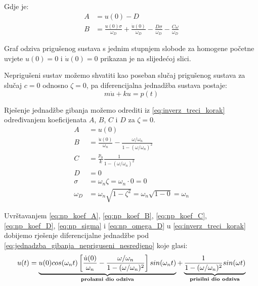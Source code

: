 Gdje je:
\begin{align}
    A &= u(0)-D\label{eq:koef_A}\\
    B &= \frac{u(0)\sigma}{\omega_D}+
         \frac{\dot{u}(0)}{\omega_D}-
         \frac{D\sigma}{\omega_D}-
         \frac{C\omega}{\omega_D}\label{eq:koef_B}
\end{align}

Graf odziva prigušenog sustava s jednim stupnjem slobode za homogene početne
uvjete $u(0)=0$ i $\dot{u}(0)=0$ prikazan je na slijedećoj slici.

Neprigušeni sustav možemo shvatiti kao poseban slučaj prigušenog sustava za slučaj
$c=0$ odnosno $\zeta=0$, pa diferencijalna jednadžba sustava postaje:
\begin{equation}\label{eq:jednadzba_gibanja_nepriguseni_nesredjeno}
	m\ddot{u}+ku=p(t)
\end{equation}

Rješenje jednadžbe gibanja možemo odrediti iz \eqref{eq:inverz_treci_korak}
određivanjem koeficijenata $A$, $B$, $C$ i $D$ za $\zeta = 0$.
\begin{align}
    A &= u(0) \label{eq:np_koef_A}\\
    B &= \frac{\dot{u}(0)}{\omega_n}-\frac{\omega/\omega_n}{1-(\omega/\omega_n)^2}\label{eq:np_koef_B}\\
    C &= \frac{p_0}{k}\frac{1}{1-(\omega/\omega_n)^2}\label{eq:np_koef_C}\\
    D &= 0\label{eq:np_koef_D}\\
    \sigma &= \omega_n\zeta=\omega_n\cdot 0=0\label{eq:np_sigma}\\
    \omega_D &= \omega_n\sqrt{1-\zeta^2}=\omega_n\sqrt{1-0}=\omega_n\label{eq:np_omega_D}
\end{align}

Uvrštavanjem \eqref{eq:np_koef_A}, \eqref{eq:np_koef_B}, \eqref{eq:np_koef_C},
\eqref{eq:np_koef_D}, \eqref{eq:np_sigma} i \eqref{eq:np_omega_D} u  \eqref{eq:inverz_treci_korak}
dobijemo rješenje diferencijalne jednadžbe pod
\eqref{eq:jednadzba_gibanja_nepriguseni_nesredjeno} 
koje glasi:
\begin{equation}
	u(t)=\underbrace{
            u(0)cos(\omega_n t)
	\left[
		\frac{\dot{u}(0)}{\omega_n}-\frac{\omega/\omega_n}{1-(\omega/\omega_n)^2}
        \right]sin(\omega_n t)\\
	}_{\text{\textbf{prolazni dio odziva}}}
        +
	\underbrace{
		\frac{1}{1-(\omega/\omega_n)^2} sin(\omega t)
	}_{\text{\textbf{prisilni dio odziva}}}
\end{equation}



